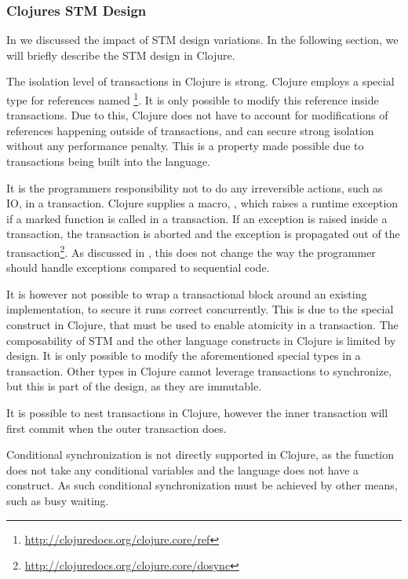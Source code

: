 \subsubsection{Clojures \acs{STM} Design}
In  we discussed the impact of \ac{STM} design variations. In the following section, we will briefly describe the \ac{STM} design in Clojure.

The isolation level of transactions in Clojure is strong. Clojure employs a special type for references named \footnote{\url{http://clojuredocs.org/clojure.core/ref}}. It is only possible to modify this reference  inside transactions. Due to this, Clojure does not have to account for modifications of references happening outside of transactions, and can secure strong isolation without any performance penalty. This is a property made possible due to transactions being built into the language. 

It is the programmers responsibility not to do any irreversible actions, such as \ac{IO}, in a transaction. Clojure supplies a macro, , which raises a runtime exception if a marked function is called in a transaction. If an exception is raised inside a transaction, the transaction is aborted and the exception is propagated out of the transaction\footnote{\url{http://clojuredocs.org/clojure.core/dosync}}. As discussed in , this does not change the way the programmer should handle exceptions compared to sequential code. 

It is however not possible to wrap a transactional block around an existing implementation, to secure it runs correct concurrently. This is due to the special  construct in Clojure, that must be used to enable atomicity in a transaction. The composability of \ac{STM} and the other language constructs in Clojure is limited by design. It is only possible to modify the aforementioned special types in a transaction. Other types in Clojure cannot leverage transactions to synchronize, but this is part of the design, as they are immutable. 

It is possible to nest transactions in Clojure, however the inner transaction will first commit when the outer transaction does.

Conditional synchronization is not directly supported in Clojure, as the  function does not take any conditional variables and the language does not have a  construct. As such conditional synchronization must be achieved by other means, such as busy waiting.

